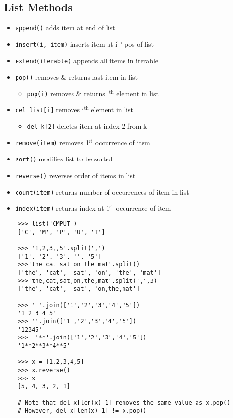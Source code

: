 \documentclass{article}
\begin{document}
\subsection{List Methods}
    \begin{multicols}{2}
        \begin{itemize}
            \item \texttt{append()} adds item at end of list
            \item \texttt{insert(i, item)} inserts item at i$^{\mathrm{th}}$ pos of list
            \item \texttt{extend(iterable)} appends all items in iterable
            \item \texttt{pop()} removes \& returns last item in list
                \begin{itemize}
                    \item \texttt{pop(i)} removes \& returns i$^{\mathrm{th}}$ element in list
                \end{itemize}
            \item \texttt{del list[i]} removes i$^{\mathrm{th}}$ element in list
                \begin{itemize}
                    \item \texttt{del k[2]} deletes item at index 2 from k
                \end{itemize}
            \item \texttt{remove(item)} removes 1$^{\mathrm{st}}$ occurrence of item
            \item \texttt{sort()} modifies list to be sorted
            \item \texttt{reverse()} reverses order of items in list
            \item \texttt{count(item)} returns number of occurrences of item in list
            \item \texttt{index(item)} returns index at 1$^{\mathrm{st}}$ occurrence of item
        \end{itemize}
    \end{multicols}

\begin{lstlisting}
    >>> list('CMPUT')
    ['C', 'M', 'P', 'U', 'T']
    
    >>> '1,2,3,,5'.split(',')
    ['1', '2', '3', '', '5']
    >>>'the cat sat on the mat'.split()
    ['the', 'cat', 'sat', 'on', 'the', 'mat']
    >>>'the,cat,sat,on,the,mat'.split(',',3)
    ['the', 'cat', 'sat', 'on,the,mat']
    
    >>> ' '.join(['1','2','3','4','5'])
    '1 2 3 4 5'
    >>> ''.join(['1','2','3','4','5'])
    '12345'
    >>>  '**'.join(['1','2','3','4','5'])
    '1**2**3**4**5'
    
    >>> x = [1,2,3,4,5]
    >>> x.reverse()
    >>> x
    [5, 4, 3, 2, 1]
    
    # Note that del x[len(x)-1] removes the same value as x.pop()
    # However, del x[len(x)-1] != x.pop()
    
\end{lstlisting}
\end{document}
